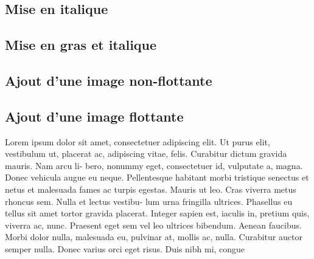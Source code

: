 \subsection{Mise en italique}


\subsection{Mise en gras et italique}


\subsection{Ajout d'une image non-flottante}


\subsection{Ajout d'une image flottante}

Lorem ipsum dolor sit amet, consectetuer adipiscing elit. Ut purus elit, vestibulum
ut, placerat ac, adipiscing vitae, felis. Curabitur dictum gravida mauris. Nam arcu li-
bero, nonummy eget, consectetuer id, vulputate a, magna. Donec vehicula augue eu
neque. Pellentesque habitant morbi tristique senectus et netus et malesuada fames ac
turpis egestas. Mauris ut leo. Cras viverra metus rhoncus sem. Nulla et lectus vestibu-
lum urna fringilla ultrices. Phasellus eu tellus sit amet tortor gravida placerat. Integer
sapien est, iaculis in, pretium quis, viverra ac, nunc. Praesent eget sem vel leo ultrices
bibendum. Aenean faucibus. Morbi dolor nulla, malesuada eu, pulvinar at, mollis ac,
nulla. Curabitur auctor semper nulla. Donec varius orci eget risus. Duis nibh mi, congue




